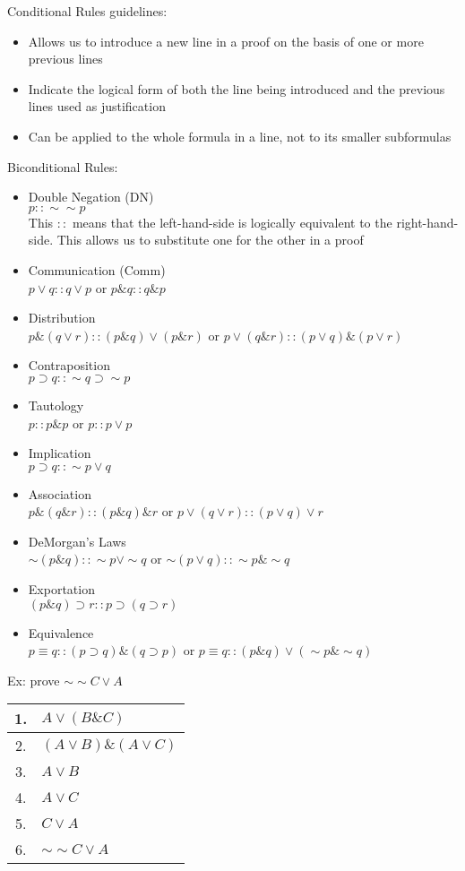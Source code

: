 Conditional Rules guidelines:
\begin{itemize}
    \item Allows us to introduce a new line in a proof on the basis of one or more previous lines
    \item Indicate the logical form of both the line being introduced and the previous lines used as justification
    \item Can be applied to the whole formula in a line, not to its smaller subformulas
\end{itemize}
Biconditional Rules:
\begin{itemize}
    \item Double Negation (DN)\\
    $p::\sim\sim p$\\
    This $::$ means that the left-hand-side is logically equivalent to the right-hand-side. This allows us to substitute one for the other in a proof
    \item Communication (Comm)\\
    $p\vee q::q\vee p$ or $p\& q:: q\& p$
    \item Distribution\\
    $p\&(q\vee r)::(p\& q)\vee(p\& r)$ or $p\vee(q\& r)::(p\vee q)\&(p\vee r)$
    \item Contraposition\\
    $p\supset q::\sim q\supset\sim p$
    \item Tautology\\
    $p::p\& p$ or $p::p\vee p$
    \item Implication\\
    $p\supset q::\sim p\vee q$
    \item Association\\
    $p\&(q\& r)::(p\& q)\& r$ or $p\vee(q\vee r)::(p\vee q)\vee r$
    \item DeMorgan's Laws\\
    $\sim(p\& q)::\sim p\vee\sim q$ or $\sim(p\vee q)::\sim p\&\sim q$
    \item Exportation\\
    $(p\& q)\supset r::p\supset(q\supset r)$
    \item Equivalence\\
    $p\equiv q::(p\supset q)\&(q\supset p)$ or $p\equiv q::(p\& q)\vee(\sim p\&\sim q)$
\end{itemize}
Ex: prove $\sim\sim C\vee A$\\
\begin{tabular}{cl}
    1. & $A\vee(B\& C)$\\
    \hline
    2. & $(A\vee B)\&(A\vee C)$\\
    3. & $A\vee B$\\
    4. & $A\vee C$\\
    5. & $C\vee A$\\
    6. & $\sim\sim C\vee A$
\end{tabular}\\
